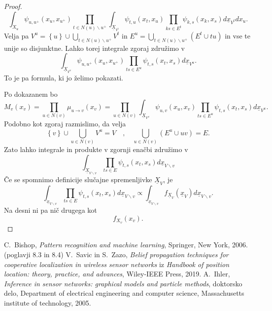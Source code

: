 \documentclass[a4paper]{article}
\begin{document}
\begin{proof}
		$$
		\int_{X_u} \psi_{u,u^+}\left(x_u,x_{u^+}\right) \prod_{t\in N\left(u\right)\backslash u^+}
		\int_{\underline{X}_{V^t}} \psi_{t,u}\left(x_t,x_u\right) \prod_{ks \in E^t} \psi_{k, s}\left(x_k, x_s\right)d\underline{x}_{V^t}dx_u.
		$$
		Velja pa $ V^u = \left\{u\right\} \cup \bigcup_{t\in N\left(u\right)\backslash u^+}V^t$ in
		$E^u = \bigcup_{t\in N\left(u\right)\backslash u^+}\left(E^t \cup tu\right)$
		in vse te unije so disjunktne.
		Lahko torej integrale zgoraj združimo v
		$$
		\int_{\underline{X}_{V^u}} \psi_{u,u^+}\left(x_u,x_{u^+}\right)
		\prod_{ts \in E^u} \psi_{t, s}\left(x_t, x_s\right)d\underline{x}_{V^u}.
		$$
		To je pa formula, ki jo želimo pokazati.

		Po dokazanem bo
		$$
		M_v\left(x_v\right) =
		\prod_{u \in N\left(v\right)}\mu_{u \to v}\left(x_v\right) =
		\prod_{u \in N\left(v\right)}
		\int_{\underline{X}_{V^u}} \psi_{u,v}\left(x_u,x_v\right) \prod_{ts \in E^u} \psi_{t, s}\left(x_t, x_s\right)d\underline{x}_{V^u}.
		$$
		Podobno kot zgoraj razmislimo, da velja
		$$
		\left\{v\right\} \cup \bigcup_{u \in N\left(v\right)}V^u = V\quad,\quad
		\bigcup_{u \in N\left(v\right)}\left(E^u \cup uv\right) = E.
		$$
		Zato lahko integrale in produkte v zgornji enačbi združimo v
		$$
		\int_{\underline{X}_{V\backslash v}} \prod_{ts \in E} \psi_{t, s}\left(x_t, x_s\right)d\underline{x}_{V\backslash v}
		$$
		Če se spomnimo definicije slučajne spremenljivke $\underline{X}_V$, je
		$$
		\int_{\underline{x}_{V\backslash v}} \prod_{ts \in E} \psi_{t, s}\left(x_t, x_s\right)d\underline{x}_{V\backslash v} \propto
		\int_{\underline{x}_{V\backslash v}} f_{\underline{X}_V}\left(\underline{x}_V\right)d\underline{x}_{V\backslash v}.
		$$
		Na desni ni pa nič drugega kot
		$$
		f_{X_v}\left(x_v\right).
		$$
	\end{proof}

	\newpage
	\begin{thebibliography}{9}
		C.~Bishop, \emph{Pattern recognition and machine learning}, Springer, New York, 2006. (poglavji 8.3 in 8.4)
		V.~Savic in S.~Zazo, \emph{Belief propagation techniques for cooperative localization in wireless sensor networks} iz \emph{Handbook of position location: theory, practice, and advances}, Wiley-IEEE Press, 2019.
		A.~Ihler, \emph{Inference in sensor networks: graphical models and particle methods},
		doktorsko delo, Department of electrical engineering and computer science, Massachusetts institute of technology, 2005.

	\end{thebibliography}
\end{document}
